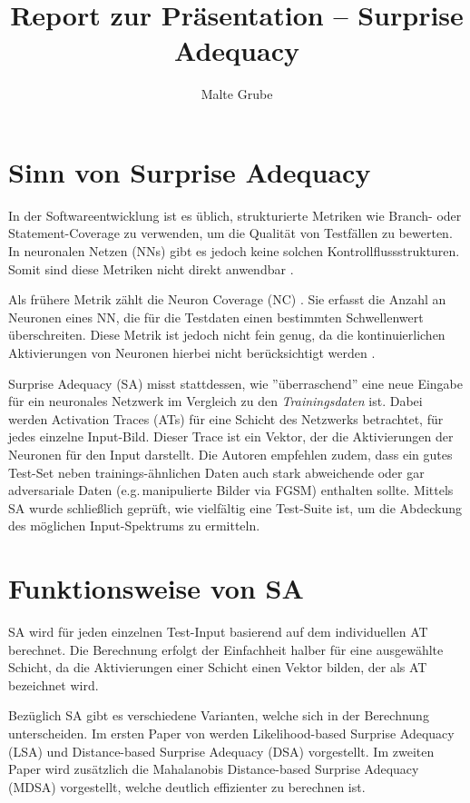 \documentclass[sigconf, natbib=false]{acmart}
\title{Report zur Präsentation -- Surprise Adequacy}
\author{Malte Grube}
\affiliation{
  \institution{Universität Rostock}
  \city{Rostock}
  \country{Deutschland}
}
\begin{document}
\maketitle

\section{Sinn von Surprise Adequacy}
In der Softwareentwicklung ist es üblich, strukturierte Metriken wie Branch- oder Statement-Coverage zu verwenden, um die Qualität von Testfällen zu bewerten. In neuronalen Netzen (NNs) gibt es jedoch keine solchen Kontrollflussstrukturen. Somit sind diese Metriken nicht direkt anwendbar \cite{sa_2}.

Als frühere Metrik zählt die Neuron Coverage (NC) \cite{neuron_coverage}. Sie erfasst die Anzahl an Neuronen eines NN, die für die Testdaten einen bestimmten Schwellenwert überschreiten. Diese Metrik ist jedoch nicht fein genug, da die kontinuierlichen Aktivierungen von Neuronen hierbei nicht berücksichtigt werden \cite{sa_1,sa_2}.

Surprise Adequacy (SA) \cite{sa_1,sa_2} misst stattdessen, wie ''überraschend'' eine neue Eingabe für ein neuronales Netzwerk im Vergleich zu den \textit{Trainingsdaten} ist. Dabei werden Activation Traces (ATs) für eine Schicht des Netzwerks betrachtet, für jedes einzelne Input-Bild. Dieser Trace ist ein Vektor, der die Aktivierungen der Neuronen für den Input darstellt. Die Autoren \cite{sa_1,sa_2} empfehlen zudem, dass ein gutes Test-Set neben trainings-ähnlichen Daten auch stark abweichende oder gar adversariale Daten (e.g.\,manipulierte Bilder via FGSM) enthalten sollte. Mittels SA wurde schließlich geprüft, wie vielfältig eine Test-Suite ist, um die Abdeckung des möglichen Input-Spektrums zu ermitteln.

\section{Funktionsweise von SA}
SA wird für jeden einzelnen Test-Input basierend auf dem individuellen AT berechnet. Die Berechnung erfolgt der Einfachheit halber für eine ausgewählte Schicht, da die Aktivierungen einer Schicht einen Vektor bilden, der als AT bezeichnet wird.

Bezüglich SA gibt es verschiedene Varianten, welche sich in der Berechnung unterscheiden. Im ersten Paper von \cite{sa_1} werden Likelihood-based Surprise Adequacy (LSA) und Distance-based Surprise Adequacy (DSA) vorgestellt. Im zweiten Paper \cite{sa_2} wird zusätzlich die Mahalanobis Distance-based Surprise Adequacy (MDSA) vorgestellt, welche deutlich effizienter zu berechnen ist. 
\end{document}
